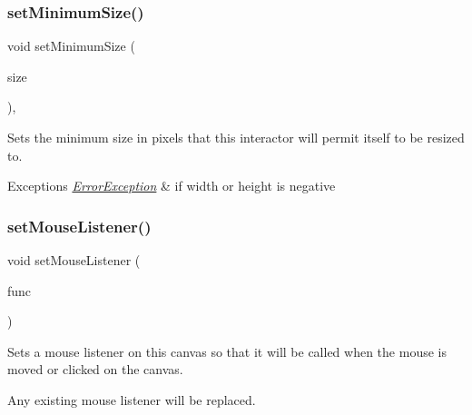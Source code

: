 \subsubsection{\texorpdfstring{set\+Minimum\+Size()}{setMinimumSize()}\hspace{0.1cm}{\footnotesize\ttfamily [2/2]}}
{\footnotesize\ttfamily void set\+Minimum\+Size (\begin{DoxyParamCaption}\item[{const \mbox{\hyperlink{classGDimension}{G\+Dimension}} \&}]{size }\end{DoxyParamCaption})\hspace{0.3cm}{\ttfamily [virtual]}, {\ttfamily [inherited]}}



Sets the minimum size in pixels that this interactor will permit itself to be resized to. 


\begin{DoxyExceptions}{Exceptions}
{\em \mbox{\hyperlink{classErrorException}{Error\+Exception}}} & if width or height is negative \\
\hline
\end{DoxyExceptions}
\mbox{\label{classGCanvas_a37d8dbc943f59920f705b0104f60bde2}} 
\subsubsection{\texorpdfstring{set\+Mouse\+Listener()}{setMouseListener()}\hspace{0.1cm}{\footnotesize\ttfamily [1/2]}}
{\footnotesize\ttfamily void set\+Mouse\+Listener (\begin{DoxyParamCaption}\item[{G\+Event\+Listener}]{func }\end{DoxyParamCaption})\hspace{0.3cm}{\ttfamily [virtual]}}



Sets a mouse listener on this canvas so that it will be called when the mouse is moved or clicked on the canvas. 

Any existing mouse listener will be replaced. \mbox{\label{classGCanvas_aea7f647ea62d59f71b5fad6aa65eeaf9}} 
